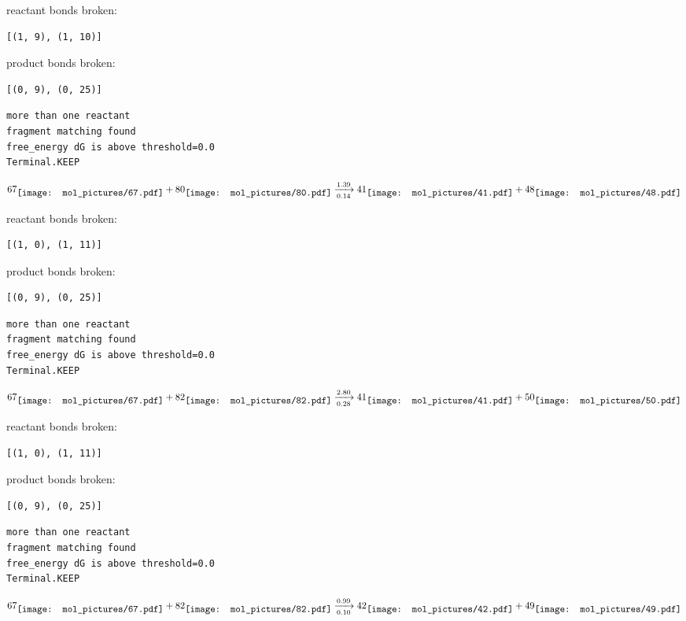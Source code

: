 \documentclass{article}
\begin{document}
reactant bonds broken:\begin{verbatim}
[(1, 9), (1, 10)]
\end{verbatim}
product bonds broken:\begin{verbatim}
[(0, 9), (0, 25)]
\end{verbatim}




\vspace{1cm}
\begin{verbatim}
more than one reactant
fragment matching found
free_energy dG is above threshold=0.0
Terminal.KEEP
\end{verbatim}
$$
67
\raisebox{-.5\height}{\texttt{[image: mol\_pictures/67.pdf]}}
+
80
\raisebox{-.5\height}{\texttt{[image: mol\_pictures/80.pdf]}}
\xrightarrow[0.14]{1.39}
41
\raisebox{-.5\height}{\texttt{[image: mol\_pictures/41.pdf]}}
+
48
\raisebox{-.5\height}{\texttt{[image: mol\_pictures/48.pdf]}}
$$


reactant bonds broken:\begin{verbatim}
[(1, 0), (1, 11)]
\end{verbatim}
product bonds broken:\begin{verbatim}
[(0, 9), (0, 25)]
\end{verbatim}




\vspace{1cm}
\begin{verbatim}
more than one reactant
fragment matching found
free_energy dG is above threshold=0.0
Terminal.KEEP
\end{verbatim}
$$
67
\raisebox{-.5\height}{\texttt{[image: mol\_pictures/67.pdf]}}
+
82
\raisebox{-.5\height}{\texttt{[image: mol\_pictures/82.pdf]}}
\xrightarrow[0.28]{2.80}
41
\raisebox{-.5\height}{\texttt{[image: mol\_pictures/41.pdf]}}
+
50
\raisebox{-.5\height}{\texttt{[image: mol\_pictures/50.pdf]}}
$$


reactant bonds broken:\begin{verbatim}
[(1, 0), (1, 11)]
\end{verbatim}
product bonds broken:\begin{verbatim}
[(0, 9), (0, 25)]
\end{verbatim}




\vspace{1cm}
\begin{verbatim}
more than one reactant
fragment matching found
free_energy dG is above threshold=0.0
Terminal.KEEP
\end{verbatim}
$$
67
\raisebox{-.5\height}{\texttt{[image: mol\_pictures/67.pdf]}}
+
82
\raisebox{-.5\height}{\texttt{[image: mol\_pictures/82.pdf]}}
\xrightarrow[0.10]{0.99}
42
\raisebox{-.5\height}{\texttt{[image: mol\_pictures/42.pdf]}}
+
49
\raisebox{-.5\height}{\texttt{[image: mol\_pictures/49.pdf]}}
$$
\end{document}
